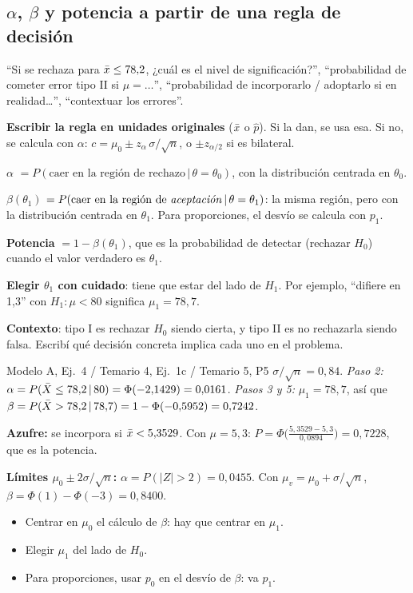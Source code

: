\subsection{$\alpha$, $\beta$ y potencia a partir de una regla de decisión}\label{p:ab}
\begin{cuando}
``Si se rechaza para $\bar{x}\le78{,}2$, ¿cuál es el nivel de significación?'', ``probabilidad de cometer error tipo II si $\mu=\dots$'', ``probabilidad de incorporarlo / adoptarlo si en realidad\ldots'', ``contextuar los errores''.
\end{cuando}
\begin{pasos}
\begin{pasolista}
\item \textbf{Escribir la regla en unidades originales} ($\bar{x}$ o $\hat p$). Si la dan, se usa esa. Si no, se calcula con $\alpha$: $c=\mu_0\pm z_\alpha\,\sigma/\sqrt n$, o $\pm z_{\alpha/2}$ si es bilateral.
\item \textbf{$\alpha$} $=P(\text{caer en la región de rechazo}\,|\,\theta=\theta_0)$, con la distribución centrada en $\theta_0$.
\item \textbf{$\beta(\theta_1)$} $=P(\text{caer en la región de \emph{aceptación}}\,|\,\theta=\theta_1)$: la misma región, pero con la distribución centrada en $\theta_1$. Para proporciones, el desvío se calcula con $p_1$.
\item \textbf{Potencia} $=1-\beta(\theta_1)$, que es la probabilidad de detectar (rechazar $H_0$) cuando el valor verdadero es $\theta_1$.
\item \textbf{Elegir $\theta_1$ con cuidado}: tiene que estar del lado de $H_1$. Por ejemplo, ``difiere en 1,3'' con $H_1:\mu<80$ significa $\mu_1=78{,}7$.
\item \textbf{Contexto}: tipo I es rechazar $H_0$ siendo cierta, y tipo II es no rechazarla siendo falsa. Escribí qué decisión concreta implica cada uno en el problema.
\end{pasolista}
\end{pasos}
\begin{modelo}{Modelo A, Ej.\ 4 / Temario 4, Ej.\ 1c / Temario 5, P5}
$\sigma/\sqrt n=0{,}84$. \emph{Paso 2:} $\alpha=P(\bar{X}\le78{,}2\,|\,80)=\Phi(-2{,}1429)=0{,}0161$.
\emph{Pasos 3 y 5:} $\mu_1=78{,}7$, así que $\beta=P(\bar{X}>78{,}2\,|\,78{,}7)=1-\Phi(-0{,}5952)=0{,}7242$.

\textbf{Azufre:} se incorpora si $\bar{x}<5{,}3529$. Con $\mu=5{,}3$: $P=\Phi\big(\frac{5{,}3529-5{,}3}{0{,}0894}\big)=0{,}7228$, que es la potencia.

\textbf{Límites $\mu_0\pm2\sigma/\sqrt n$:} $\alpha=P(|Z|>2)=0{,}0455$. Con $\mu_v=\mu_0+\sigma/\sqrt n$, $\beta=\Phi(1)-\Phi(-3)=0{,}8400$.
\end{modelo}
\begin{ojo}
\begin{itemize}
\item Centrar en $\mu_0$ el cálculo de $\beta$: hay que centrar en $\mu_1$.
\item Elegir $\mu_1$ del lado de $H_0$.
\item Para proporciones, usar $p_0$ en el desvío de $\beta$: va $p_1$.
\end{itemize}
\end{ojo}

